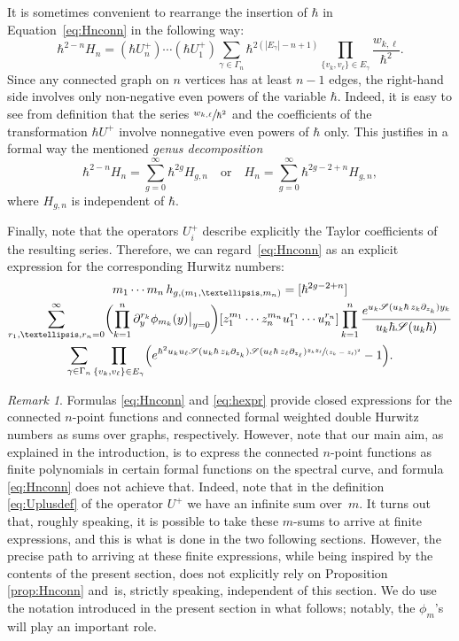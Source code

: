 \documentclass[11pt]{article}
\let\mathcal\mathscr
\theoremstyle{plain}
\theoremstyle{definition}
\theoremstyle{remark}
\newtheorem{remark}[theorem]{Remark}
\newcommand{\cS}{\mathcal{S}}
\newcommand{\Hc}{H}
\begin{document}
It is sometimes convenient to rearrange the insertion of $\hbar$ in Equation~\eqref{eq:Hnconn} in the following way:
\begin{equation*}
\hbar^{2-n}H_n=
(\hbar U^+_n)\cdots(\hbar U^+_1)
\sum_{\gamma \in \Gamma_n}\hbar^{2(|E_\gamma|-n+1)}\prod_{\{v_k,v_\ell\}\in E_\gamma}
\frac{w_{k,\ell}}{\hbar^2}.
\end{equation*}
Since any connected graph on $n$ vertices has at least $n-1$ edges, the right-hand side involves only non-negative even powers of the variable $\hbar$. Indeed, it is easy to see from definition that the series $\sfrac{w_{k,\ell}}{\hbar^2}$ and the coefficients of the transformation $\hbar U^+$ involve nonnegative even powers of $\hbar$ only. This justifies in a formal way the mentioned \emph{genus decomposition}
\begin{equation*}\label{eq:Hgndef}
\hbar^{2-n}\Hc_n=\sum_{g=0}^\infty\hbar^{2g}\Hc_{g,n}
\quad\text{or}\quad
\Hc_n=\sum_{g=0}^\infty\hbar^{2g-2+n}\Hc_{g,n},
\end{equation*}
where $\Hc_{g,n}$ is independent of $\hbar$.

Finally, note that the operators $U^+_i$ describe explicitly the Taylor coefficients of the resulting series. Therefore, we can regard~\eqref{eq:Hnconn} as an explicit expression for the corresponding Hurwitz numbers:
\begin{multline}\label{eq:hexpr}
m_1\cdots m_n\,h_{g,(m_1,\dots,m_n)}
=[\hbar^{2g-2+n}]\\
\sum_{r_1,\dots,r_n=0}^\infty
\biggl(\prod_{k=1}^n\partial_y^{r_k}\phi_{m_k}(y)\big|_{y=0}\biggr) [z_1^{m_1}\cdots z_n^{m_n}u_1^{r_1}\cdots u_n^{r_n}]
\prod_{k=1}^n \frac{e^{ u_k\cS(u_k\hbar\,z_k\partial_{z_k})y_k }}
{u_k\hbar\cS(u_k\hbar)}\\
\sum_{\gamma\in\Gamma_n} \prod_{\{v_k,v_\ell\}\in E_\gamma}
\Bigl(e^{\hbar^2u_ku_\ell\cS(u_k\hbar\,z_k\partial_{z_k})\cS(u_\ell\hbar\,z_\ell\partial_{z_\ell})
\sfrac{z_k z_\ell}{(z_k-z_\ell)^2}}-1\Bigr).
\end{multline}

\begin{remark}
Formulas \eqref{eq:Hnconn} and \eqref{eq:hexpr} provide closed expressions for the connected $n$-point functions and connected formal weighted double Hurwitz numbers as sums over graphs, respectively. However, note that our main aim, as explained in the introduction, is to express the connected $n$-point functions as finite polynomials in certain formal functions on the spectral curve, and formula \eqref{eq:Hnconn} does not achieve that. Indeed, note that in the definition \eqref{eq:Uplusdef} of the operator $U^+$ we have an infinite sum over~$m$. It turns out that, roughly speaking, it is possible to
take these $m$-sums to arrive at finite expressions, and this is what is done in the two following sections. However, the precise path to arriving at these finite expressions, while being inspired by the contents of the present section, does not explicitly rely on Proposition \ref{prop:Hnconn} and~is, strictly speaking, independent of this section. We do use the notation introduced in the present section in what follows; notably, the $\phi_m$'s will play an important role.
\end{remark}
\end{document}
